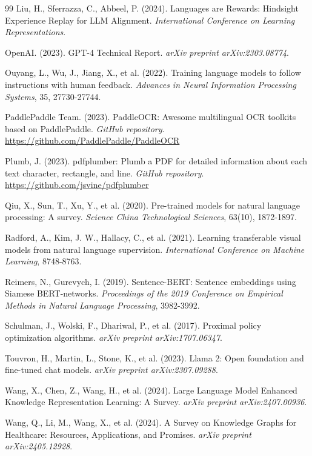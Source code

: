 \documentclass[11pt,a4paper]{article}
\begin{document}
\begin{thebibliography}{99}
Liu, H., Sferrazza, C., Abbeel, P. (2024). 
Languages are Rewards: Hindsight Experience Replay for LLM Alignment. 
\textit{International Conference on Learning Representations}.

OpenAI. (2023). 
GPT-4 Technical Report. 
\textit{arXiv preprint arXiv:2303.08774}.

Ouyang, L., Wu, J., Jiang, X., et al. (2022). 
Training language models to follow instructions with human feedback. 
\textit{Advances in Neural Information Processing Systems}, 35, 27730-27744.

PaddlePaddle Team. (2023). 
PaddleOCR: Awesome multilingual OCR toolkits based on PaddlePaddle. 
\textit{GitHub repository}. \url{https://github.com/PaddlePaddle/PaddleOCR}

Plumb, J. (2023). 
pdfplumber: Plumb a PDF for detailed information about each text character, rectangle, and line. 
\textit{GitHub repository}. \url{https://github.com/jsvine/pdfplumber}

Qiu, X., Sun, T., Xu, Y., et al. (2020). 
Pre-trained models for natural language processing: A survey. 
\textit{Science China Technological Sciences}, 63(10), 1872-1897.

Radford, A., Kim, J. W., Hallacy, C., et al. (2021). 
Learning transferable visual models from natural language supervision. 
\textit{International Conference on Machine Learning}, 8748-8763.

Reimers, N., Gurevych, I. (2019). 
Sentence-BERT: Sentence embeddings using Siamese BERT-networks. 
\textit{Proceedings of the 2019 Conference on Empirical Methods in Natural Language Processing}, 3982-3992.

Schulman, J., Wolski, F., Dhariwal, P., et al. (2017). 
Proximal policy optimization algorithms. 
\textit{arXiv preprint arXiv:1707.06347}.

Touvron, H., Martin, L., Stone, K., et al. (2023). 
Llama 2: Open foundation and fine-tuned chat models. 
\textit{arXiv preprint arXiv:2307.09288}.

Wang, X., Chen, Z., Wang, H., et al. (2024). 
Large Language Model Enhanced Knowledge Representation Learning: A Survey. 
\textit{arXiv preprint arXiv:2407.00936}.

Wang, Q., Li, M., Wang, X., et al. (2024). 
A Survey on Knowledge Graphs for Healthcare: Resources, Applications, and Promises. 
\textit{arXiv preprint arXiv:2405.12928}.


\end{thebibliography}
\end{document}
